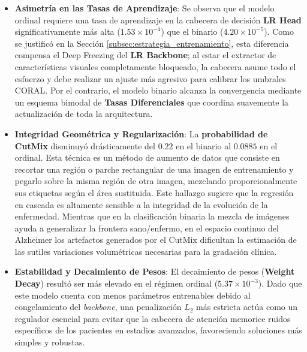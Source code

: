 \documentclass[12pt, oneside, english, spanish]{book}
\begin{document}
\begin{itemize}
	\item \textbf{Asimetría en las Tasas de Aprendizaje}: Se observa que el modelo ordinal requiere una tasa de aprendizaje en la cabecera de decisión \textbf{LR Head} significativamente más alta ($1.53 \times 10^{-4}$) que el binario ($4.20 \times 10^{-5}$). Como se justificó en la Sección \ref{subsec:estrategia_entrenamiento}, esta diferencia compensa el Deep Freezing del \textbf{LR Backbone}; al estar el extractor de características visuales completamente bloqueado, la cabecera asume todo el esfuerzo y debe realizar un ajuste más agresivo para calibrar los umbrales CORAL. Por el contrario, el modelo binario alcanza la convergencia mediante un esquema bimodal de \textbf{Tasas Diferenciales} que coordina suavemente la actualización de toda la arquitectura.
	
	\item \textbf{Integridad Geométrica y Regularización}: La \textbf{probabilidad de CutMix} disminuyó drásticamente del $0.22$ en el binario al $0.0885$ en el ordinal. Esta técnica es un método de aumento de datos que consiste en recortar una región o parche rectangular de una imagen de entrenamiento y pegarlo sobre la misma región de otra imagen, mezclando proporcionalmente sus etiquetas según el área sustituida. Este hallazgo
	sugiere que la regresión en cascada es altamente sensible a la integridad de la evolución de la enfermedad. Mientras que en la clasificación binaria la mezcla de
	imágenes ayuda a generalizar la frontera sano/enfermo, en el espacio continuo del
	Alzheimer los artefactos generados por el CutMix dificultan la estimación de las
	sutiles variaciones volumétricas necesarias para la gradación clínica.
		
	\item \textbf{Estabilidad y Decaimiento de Pesos}: El decaimiento de pesos (\textbf{Weight Decay}) resultó ser más elevado en el régimen ordinal ($5.37 \times 10^{-3}$). Dado que este modelo cuenta con menos parámetros entrenables debido al congelamiento del \textit{backbone}, una penalización $L_2$ más estricta actúa como un regulador esencial para evitar que la cabecera de atención memorice ruidos específicos de los pacientes en estadios avanzados, favoreciendo soluciones más simples y robustas.
\end{itemize}
\end{document}
